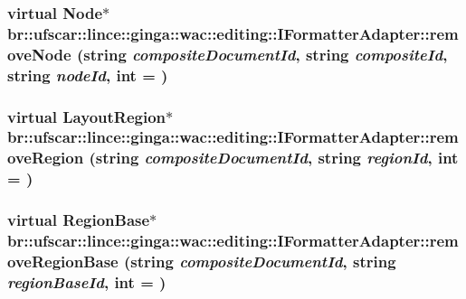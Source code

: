 \label{classbr_1_1ufscar_1_1lince_1_1ginga_1_1wac_1_1editing_1_1IFormatterAdapter_a50258960e9a5f4405e249e58aa2fa109}
\hypertarget{classbr_1_1ufscar_1_1lince_1_1ginga_1_1wac_1_1editing_1_1IFormatterAdapter_a13c6761d64d836b7ddf83df6aa435455}{
\subsubsection[{removeNode}]{\setlength{\rightskip}{0pt plus 5cm}virtual Node$\ast$ br::ufscar::lince::ginga::wac::editing::IFormatterAdapter::removeNode (string {\em compositeDocumentId}, \/  string {\em compositeId}, \/  string {\em nodeId}, \/  int = {})}}
\label{classbr_1_1ufscar_1_1lince_1_1ginga_1_1wac_1_1editing_1_1IFormatterAdapter_a13c6761d64d836b7ddf83df6aa435455}
\hypertarget{classbr_1_1ufscar_1_1lince_1_1ginga_1_1wac_1_1editing_1_1IFormatterAdapter_a7451f3f638fd722aabaacf2674620e13}{
\subsubsection[{removeRegion}]{\setlength{\rightskip}{0pt plus 5cm}virtual LayoutRegion$\ast$ br::ufscar::lince::ginga::wac::editing::IFormatterAdapter::removeRegion (string {\em compositeDocumentId}, \/  string {\em regionId}, \/  int = {})}}
\label{classbr_1_1ufscar_1_1lince_1_1ginga_1_1wac_1_1editing_1_1IFormatterAdapter_a7451f3f638fd722aabaacf2674620e13}
\hypertarget{classbr_1_1ufscar_1_1lince_1_1ginga_1_1wac_1_1editing_1_1IFormatterAdapter_a1994d2a14c28cd577919f3988b224f00}{
\subsubsection[{removeRegionBase}]{\setlength{\rightskip}{0pt plus 5cm}virtual RegionBase$\ast$ br::ufscar::lince::ginga::wac::editing::IFormatterAdapter::removeRegionBase (string {\em compositeDocumentId}, \/  string {\em regionBaseId}, \/  int = {})}}
